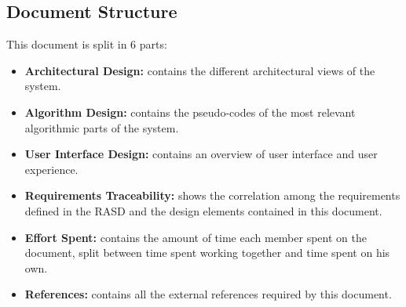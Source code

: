 \subsection{Document Structure}
This document is split in 6 parts:
\begin{itemize}
    \item \textbf{Architectural Design:} contains the different architectural views of the system.
    \item \textbf{Algorithm Design:} contains the pseudo-codes of the most relevant algorithmic parts of the system.
    \item \textbf{User Interface Design:} contains an overview of user interface and user experience.
    \item \textbf{Requirements Traceability:} shows the correlation among the requirements defined in the RASD and the design elements contained in this document.
    \item \textbf{Effort Spent:} contains the amount of time each member spent on the document, split between time spent working together and time spent on his own.
    \item \textbf{References:} contains all the external references required by this document.
\end{itemize}
